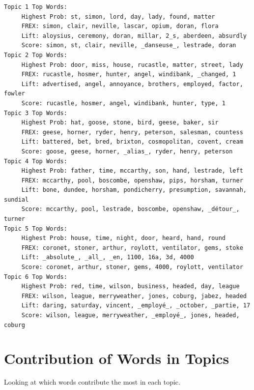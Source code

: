 \documentclass[
  letterpaper,
  DIV=11,
  numbers=noendperiod]{scrreprt}
\begin{document}
\begin{verbatim}
Topic 1 Top Words:
     Highest Prob: st, simon, lord, day, lady, found, matter 
     FREX: simon, clair, neville, lascar, opium, doran, flora 
     Lift: aloysius, ceremony, doran, millar, 2_s, aberdeen, absurdly 
     Score: simon, st, clair, neville, _danseuse_, lestrade, doran 
Topic 2 Top Words:
     Highest Prob: door, miss, house, rucastle, matter, street, lady 
     FREX: rucastle, hosmer, hunter, angel, windibank, _changed, 1 
     Lift: advertised, angel, annoyance, brothers, employed, factor, fowler 
     Score: rucastle, hosmer, angel, windibank, hunter, type, 1 
Topic 3 Top Words:
     Highest Prob: hat, goose, stone, bird, geese, baker, sir 
     FREX: geese, horner, ryder, henry, peterson, salesman, countess 
     Lift: battered, bet, bred, brixton, cosmopolitan, covent, cream 
     Score: goose, geese, horner, _alias_, ryder, henry, peterson 
Topic 4 Top Words:
     Highest Prob: father, time, mccarthy, son, hand, lestrade, left 
     FREX: mccarthy, pool, boscombe, openshaw, pips, horsham, turner 
     Lift: bone, dundee, horsham, pondicherry, presumption, savannah, sundial 
     Score: mccarthy, pool, lestrade, boscombe, openshaw, _détour_, turner 
Topic 5 Top Words:
     Highest Prob: house, time, night, door, heard, hand, round 
     FREX: coronet, stoner, arthur, roylott, ventilator, gems, stoke 
     Lift: _absolute_, _all_, _en, 1100, 16a, 3d, 4000 
     Score: coronet, arthur, stoner, gems, 4000, roylott, ventilator 
Topic 6 Top Words:
     Highest Prob: red, time, wilson, business, headed, day, league 
     FREX: wilson, league, merryweather, jones, coburg, jabez, headed 
     Lift: daring, saturday, vincent, _employé_, _october, _partie, 17 
     Score: wilson, league, merryweather, _employé_, jones, headed, coburg 
\end{verbatim}

\section{Contribution of Words in
Topics}\label{contribution-of-words-in-topics}

Looking at which words contribute the most in each topic.
\end{document}
